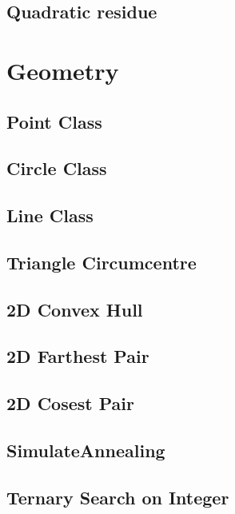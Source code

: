 \documentclass[a4paper,10pt,twocolumn,oneside]{article}
\begin{document}
\subsection{Quadratic residue}


\section{Geometry}
\subsection{Point Class}

\subsection{Circle Class}

\subsection{Line Class}

\subsection{Triangle Circumcentre}

\subsection{2D Convex Hull}

\subsection{2D Farthest Pair}

\subsection{2D Cosest Pair}

\subsection{SimulateAnnealing}

\subsection{Ternary Search on Integer}

\end{document}
